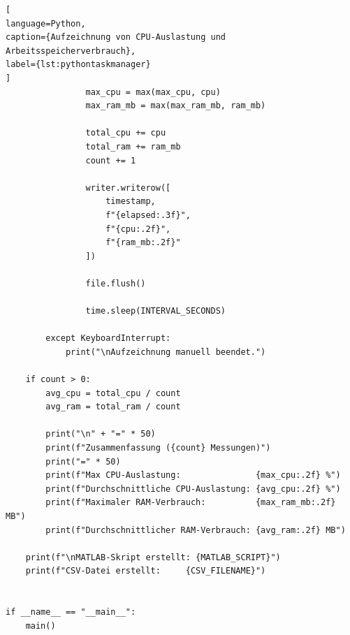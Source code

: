 \begin{lstlisting}[
language=Python,
caption={Aufzeichnung von CPU-Auslastung und Arbeitsspeicherverbrauch},
label={lst:pythontaskmanager}
]
                max_cpu = max(max_cpu, cpu)
                max_ram_mb = max(max_ram_mb, ram_mb)

                total_cpu += cpu
                total_ram += ram_mb
                count += 1

                writer.writerow([
                    timestamp,
                    f"{elapsed:.3f}",
                    f"{cpu:.2f}",
                    f"{ram_mb:.2f}"
                ])

                file.flush()

                time.sleep(INTERVAL_SECONDS)

        except KeyboardInterrupt:
            print("\nAufzeichnung manuell beendet.")

    if count > 0:
        avg_cpu = total_cpu / count
        avg_ram = total_ram / count

        print("\n" + "=" * 50)
        print(f"Zusammenfassung ({count} Messungen)")
        print("=" * 50)
        print(f"Max CPU-Auslastung:               {max_cpu:.2f} %")
        print(f"Durchschnittliche CPU-Auslastung: {avg_cpu:.2f} %")
        print(f"Maximaler RAM-Verbrauch:          {max_ram_mb:.2f} MB")
        print(f"Durchschnittlicher RAM-Verbrauch: {avg_ram:.2f} MB")

    print(f"\nMATLAB-Skript erstellt: {MATLAB_SCRIPT}")
    print(f"CSV-Datei erstellt:     {CSV_FILENAME}")


if __name__ == "__main__":
    main()
\end{lstlisting}

\clearpage
